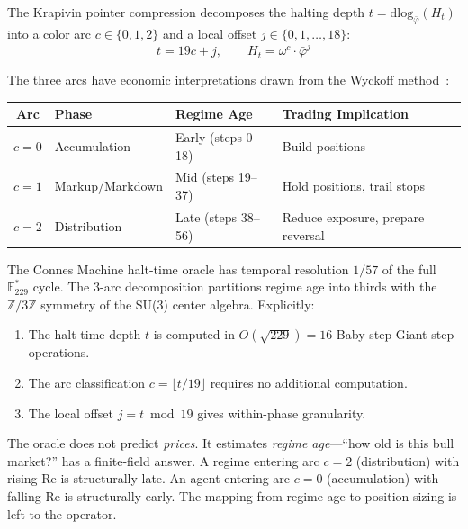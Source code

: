 The Krapivin pointer compression decomposes the halting depth $t = \mathrm{dlog}_{\bar\varphi}(H_t)$ into a color arc $c \in \{0, 1, 2\}$ and a local offset $j \in \{0, 1, \ldots, 18\}$:
\begin{equation}
    t = 19c + j, \qquad H_t = \omega^c \cdot \bar\varphi^j
\end{equation}

The three arcs have economic interpretations drawn from the Wyckoff method~\cite{wyckoff1931}:
\begin{center}\small
\begin{tabular}{@{}clll@{}}
\toprule
\textbf{Arc} & \textbf{Phase} & \textbf{Regime Age} & \textbf{Trading Implication} \\
\midrule
$c = 0$ & Accumulation & Early (steps 0--18) & Build positions \\
$c = 1$ & Markup/Markdown & Mid (steps 19--37) & Hold positions, trail stops \\
$c = 2$ & Distribution & Late (steps 38--56) & Reduce exposure, prepare reversal \\
\bottomrule
\end{tabular}
\end{center}

\begin{result}\label{res:halt_time}
The Connes Machine halt-time oracle has temporal resolution $1/57$ of the full $\mathbb{F}_{229}^*$ cycle. The 3-arc decomposition partitions regime age into thirds with the $\mathbb{Z}/3\mathbb{Z}$ symmetry of the SU(3) center algebra. Explicitly:
\begin{enumerate}[noitemsep]
    \item The halt-time depth $t$ is computed in $O(\sqrt{229}) = 16$ Baby-step Giant-step operations.
    \item The arc classification $c = \lfloor t/19 \rfloor$ requires no additional computation.
    \item The local offset $j = t \bmod 19$ gives within-phase granularity.
\end{enumerate}
\end{result}

The oracle does not predict \emph{prices}. It estimates \emph{regime age}---``how old is this bull market?'' has a finite-field answer. A regime entering arc $c = 2$ (distribution) with rising Re is structurally late. An agent entering arc $c = 0$ (accumulation) with falling Re is structurally early. The mapping from regime age to position sizing is left to the operator.

